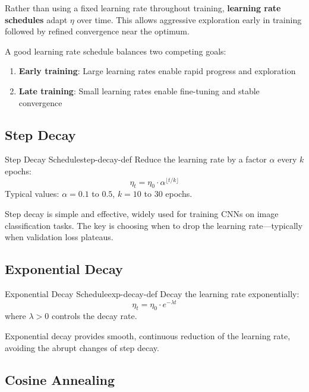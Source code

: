 \documentclass[../../main.tex]{subfiles}
\begin{document}
Rather than using a fixed learning rate throughout training, \textbf{learning rate schedules} adapt $\eta$ over time. This allows aggressive exploration early in training followed by refined convergence near the optimum.

\begin{principle}
A good learning rate schedule balances two competing goals:
\begin{enumerate}
    \item \textbf{Early training}: Large learning rates enable rapid progress and exploration
    \item \textbf{Late training}: Small learning rates enable fine-tuning and stable convergence
\end{enumerate}
\end{principle}

\subsection{Step Decay}

\begin{definition}{Step Decay Schedule}{step-decay-def}
Reduce the learning rate by a factor $\alpha$ every $k$ epochs:
\[
    \eta_t = \eta_0 \cdot \alpha^{\lfloor t / k \rfloor}
\]
Typical values: $\alpha = 0.1$ to $0.5$, $k = 10$ to $30$ epochs.
\end{definition}

Step decay is simple and effective, widely used for training CNNs on image classification tasks. The key is choosing when to drop the learning rate---typically when validation loss plateaus.

\subsection{Exponential Decay}

\begin{definition}{Exponential Decay Schedule}{exp-decay-def}
Decay the learning rate exponentially:
\[
    \eta_t = \eta_0 \cdot e^{-\lambda t}
\]
where $\lambda > 0$ controls the decay rate.
\end{definition}

Exponential decay provides smooth, continuous reduction of the learning rate, avoiding the abrupt changes of step decay.

\subsection{Cosine Annealing}
\end{document}
